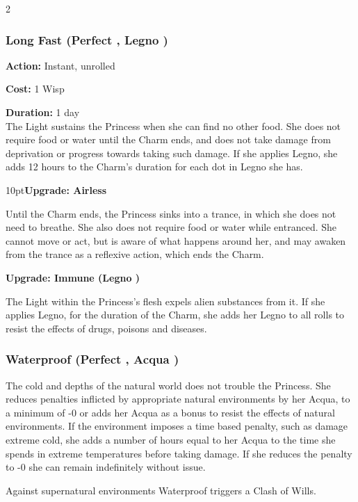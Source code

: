 \begin{multicols}{2}
\subsubsection*{Long Fast (Perfect \textbullet, Legno \textbullet)}

\noindent \textbf{Action:} Instant, unrolled

\noindent \textbf{Cost:} 1 Wisp

\noindent \textbf{Duration:} 1 day \\

\noindent The Light sustains the Princess when she can find no other food. She does not require food or water until the Charm ends, and does not take damage from deprivation or progress towards taking such damage. If she applies Legno, she adds 12 hours to the Charm's duration for each dot in Legno she has.

\begin{myindentpar}{10pt}\textbf{Upgrade: Airless}

Until the Charm ends, the Princess sinks into a trance, in which she does not need to breathe. She also does not require food or water while entranced. She cannot move or act, but is aware of what happens around her, and may awaken from the trance as a reflexive action, which ends the Charm.

\textbf{Upgrade: Immune (Legno \textbullet\textbullet)}

The Light within the Princess's flesh expels alien substances from it. If she applies Legno, for the duration of the Charm, she adds her Legno to all rolls to resist the effects of drugs, poisons and diseases.\end{myindentpar}

\subsubsection*{Waterproof (Perfect \textbullet, Acqua \textbullet)}

The cold and depths of the natural world does not trouble the Princess. She reduces penalties inflicted by appropriate natural environments by her Acqua, to a minimum of -0 or adds her Acqua as a bonus to resist the effects of natural environments. If the environment imposes a time based penalty, such as damage extreme cold, she adds a number of hours equal to her Acqua to the time she spends in extreme temperatures before taking damage.  If she reduces the penalty to -0 she can remain indefinitely without issue. 

Against supernatural environments Waterproof triggers a Clash of Wills.


\end{multicols}
